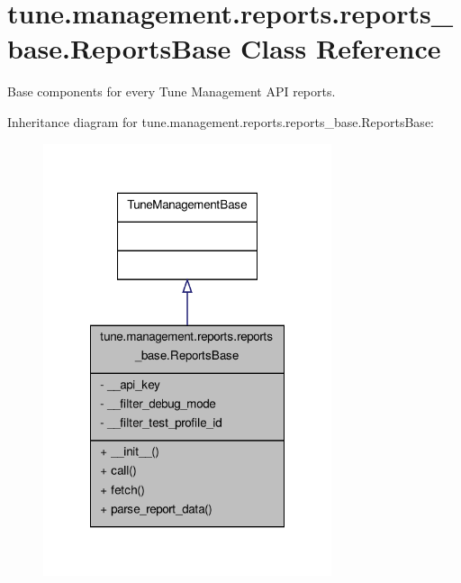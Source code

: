\hypertarget{classtune_1_1management_1_1reports_1_1reports__base_1_1ReportsBase}{\section{tune.\-management.\-reports.\-reports\-\_\-base.\-Reports\-Base Class Reference}
\label{classtune_1_1management_1_1reports_1_1reports__base_1_1ReportsBase}
}


Base components for every Tune Management A\-P\-I reports.  




Inheritance diagram for tune.\-management.\-reports.\-reports\-\_\-base.\-Reports\-Base\-:
\nopagebreak
\begin{figure}[H]
\begin{center}
\leavevmode
\includegraphics[width=240pt]{classtune_1_1management_1_1reports_1_1reports__base_1_1ReportsBase__inherit__graph}
\end{center}
\end{figure}


